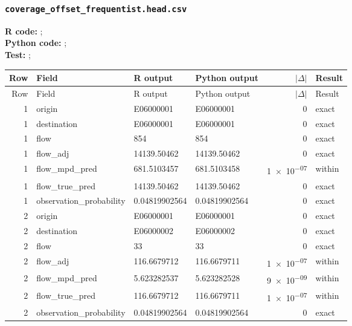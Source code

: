 \documentclass[10pt]{article}
\begin{document}
\subsubsection{\texorpdfstring{\texttt{coverage\_offset\_frequentist.head.csv}}{coverage\_offset\_frequentist.head.csv}}
{\footnotesize \textbf{R code:} ; \\ \textbf{Python code:} ; \\ \textbf{Test:} ; \par}

\small
\begin{longtable}{@{}r p{}p{}p{}rl@{}}
\toprule
Row & Field & R output & Python output & $|\Delta|$ & Result \\
\midrule
\endfirsthead
\toprule
Row & Field & R output & Python output & $|\Delta|$ & Result \\
\midrule
\endhead
1 & origin & E06000001 & E06000001 & 0 & exact \\
1 & destination & E06000001 & E06000001 & 0 & exact \\
1 & flow & 854 & 854 & 0 & exact \\
1 & flow\_\allowbreak{}adj & 14139.50462 & 14139.50462 & 0 & exact \\
1 & flow\_\allowbreak{}mpd\_\allowbreak{}pred & 681.5103457 & 681.5103458 & \num{1e-07} & within \\
1 & flow\_\allowbreak{}true\_\allowbreak{}pred & 14139.50462 & 14139.50462 & 0 & exact \\
1 & observation\_\allowbreak{}probability & 0.04819902564 & 0.04819902564 & 0 & exact \\
2 & origin & E06000001 & E06000001 & 0 & exact \\
2 & destination & E06000002 & E06000002 & 0 & exact \\
2 & flow & 33 & 33 & 0 & exact \\
2 & flow\_\allowbreak{}adj & 116.6679712 & 116.6679711 & \num{1e-07} & within \\
2 & flow\_\allowbreak{}mpd\_\allowbreak{}pred & 5.623282537 & 5.623282528 & \num{9e-09} & within \\
2 & flow\_\allowbreak{}true\_\allowbreak{}pred & 116.6679712 & 116.6679711 & \num{1e-07} & within \\
2 & observation\_\allowbreak{}probability & 0.04819902564 & 0.04819902564 & 0 & exact \\

\end{longtable}
\end{document}
